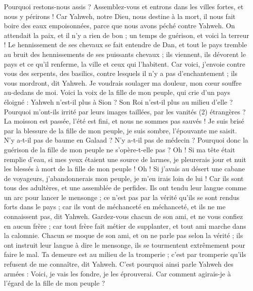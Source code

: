 \begin{multicols}{2}
Pourquoi restons-nous assis ? Assemblez-vous et entrons dans les villes fortes, et nous y périrons ! Car Yahweh, notre Dieu, nous destine à la mort, il nous fait boire des eaux empoisonnées, parce que nous avons péché contre Yahweh.
On attendait la paix, et il n'y a rien de bon ; un temps de guérison, et voici la terreur !
Le hennissement de ses chevaux se fait entendre de Dan, et tout le pays tremble au bruit des hennissements de ses puissants chevaux ; ils viennent, ils dévorent le pays et ce qu'il renferme, la ville et ceux qui l'habitent.
Car voici, j'envoie contre vous des serpents, des basilics, contre lesquels il n'y a pas d'enchantement ; ils vous mordront, dit Yahweh.
Je voudrais soulager ma douleur, mon cœur souffre au-dedans de moi.
Voici la voix de la fille de mon peuple, qui crie d'un pays éloigné : Yahweh n'est-il plus à Sion ? Son Roi n'est-il plus au milieu d'elle ? Pourquoi m'ont-ils irrité par leurs images taillées, par les vanités (2) étrangères ?
La moisson est passée, l'été est fini, et nous ne sommes pas sauvés !
Je suis brisé par la blessure de la fille de mon peuple, je suis sombre, l'épouvante me saisit.
N'y a-t-il pas de baume en Galaad ? N'y a-t-il pas de médecin ? Pourquoi donc la guérison de la fille de mon peuple ne s'opère-t-elle pas ?
\VerseOne{}Oh ! Si ma tête était remplie d'eau, si mes yeux étaient une source de larmes, je pleurerais jour et nuit les blessés à mort de la fille de mon peuple !
Oh ! Si j'avais au désert une cabane de voyageurs, j'abandonnerais mon peuple, je m'en irais loin de lui ! Car ils sont tous des adultères, et une assemblée de perfides.
Ils ont tendu leur langue comme un arc pour lancer le mensonge ; ce n'est pas par la vérité qu'ils se sont rendus forts dans le pays ; car ils vont de méchanceté en méchanceté, et ils ne me connaissent pas, dit Yahweh.
Gardez-vous chacun de son ami, et ne vous confiez en aucun frère ; car tout frère fait métier de supplanter, et tout ami marche dans la calomnie.
Chacun se moque de son ami, et on ne parle pas selon la vérité ; ils ont instruit leur langue à dire le mensonge, ils se tourmentent extrêmement pour faire le mal.
Ta demeure est au milieu de la tromperie ; c'est par tromperie qu'ils refusent de me connaître, dit Yahweh.
C'est pourquoi ainsi parle Yahweh des armées : Voici, je vais les fondre, je les éprouverai. Car comment agirais-je à l'égard de la fille de mon peuple ?

\end{multicols}
